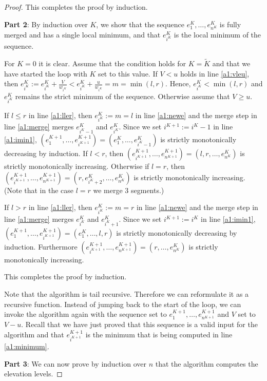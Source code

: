 \documentclass[11pt,a4paper]{article}
\begin{document}
\begin{proof}
This completes the proof by induction.

\textbf{Part 2}: By induction over $K$, we show that the sequence $e_1^K,\ldots,e_{n^K}^K$ is fully merged and has a single local minimum, and that $e_{i^K}^K$ is the local minimum of the sequence.

For $K=0$ it is clear.
Assume that the condition holds for $K = \tilde{K}$ and that we have started the loop with $K$ set to this value.
If $V < u$ holds in line \ref{a1:vleu}, then $e_{i^K}^K := e_{i^K}^K + \frac{V}{w_{i^K}} < e_{i^K}^K + \frac{u}{w_{i^K}} = m = \min(l, r)$.
Hence, $e_{i^K}^K < \min(l, r)$ and $e_{i^K}^K$ remains the strict minimum of the sequence.
Otherwise assume that $V \ge u$.

If $l \le r$ in line \ref{a1:ller}, then $e_{i^K}^K := m = l$ in line \ref{a1:newe} and the merge step in line \ref{a1:merge} merges $e_{i^K - 1}^K$ and $e_{i^K}^K$.
Since we set $i^{K+1} := i^K - 1$ in line \ref{a1:imin1},
$(e_1^{K+1},\ldots,e_{i^{K+1}}^{K+1}) = (e_1^K,\ldots,e_{i^K - 1}^K)$ is strictly monotonically decreasing by induction.
If $l < r$, then $(e_{i^{K+1}}^{K+1},\ldots,e_{n^{K+1}}^{K+1}) = (l,r,\ldots,e_{n^K}^K)$ is strictly monotonically increasing.
Otherwise if $l = r$, then $(e_{i^{K+1}}^{K+1},\ldots,e_{n^{K+1}}^{K+1}) = (r,e_{i^K+2}^K,\ldots,e_{n^K}^K)$ is strictly monotonically increasing.
(Note that in the case $l = r$ we merge 3 segments.)

If $l > r$ in line \ref{a1:ller}, then $e_{i^K}^K := m = r$ in line \ref{a1:newe} and the merge step in line \ref{a1:merge} merges $e_{i^K}^K$ and $e_{i^K + 1}^K$.
Since we set $i^{K+1} := i^K$ in line \ref{a1:imin1},
$(e_1^{K+1},\ldots,e_{i^{K+1}}^{K+1}) = (e_1^K,\ldots,l,r)$ is strictly monotonically decreasing by induction.
Furthermore $(e_{i^{K+1}}^{K+1},\ldots,e_{n^{K+1}}^{K+1}) = (r,\ldots,e_{n^K}^K)$ is strictly monotonically increasing.

This completes the proof by induction.

Note that the algorithm is tail recursive.
Therefore we can reformulate it as a recursive function.
Instead of jumping back to the start of the loop, we can invoke the algorithm again with
the sequence set to $e_1^{K+1},\ldots,e_{n^{K+1}}^{K+1}$ and $V$ set to $V - u$.
Recall that we have just proved that this sequence is a valid input for the algorithm and that $e_{i^{K+1}}^{K+1}$ is the minimum that is being computed in line \ref{a1:minimum}.

\textbf{Part 3}: We can now prove by induction over $n$ that the algorithm computes the elevation levels.


\end{proof}
\end{document}
